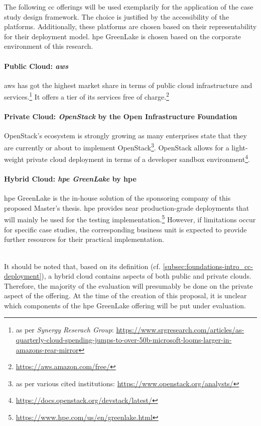 {		The following \ac{cc} offerings will be used exemplarily for the application of the case study design framework. The choice is justified by the accessibility of the platforms. Additionally, these platforms are chosen based on their representability for their deployment model. \acs{hpe} GreenLake is chosen based on the corporate environment of this research. 
		
			\paragraph{Public Cloud: \textit{\acf{aws}}} \ac{aws} has got the highest market share in terms of public cloud infrastructure and services.\footnote{as per \textit{Synergy Reserach Group}: \url{https://www.srgresearch.com/articles/as-quarterly-cloud-spending-jumps-to-over-50b-microsoft-looms-larger-in-amazons-rear-mirror}} It offers a tier of its services free of charge.\footnote{\url{https://aws.amazon.com/free/}}
			\paragraph{Private Cloud: \textit{OpenStack} by the Open Infrastructure Foundation}  OpenStack's ecosystem is strongly growing as many enterprises state that they are currently or about to implement OpenStack\footnote{as per various cited institutions: \url{https://www.openstack.org/analysts/}}. OpenStack allows for a light-weight private cloud deployment in terms of a developer sandbox environment\footnote{\url{https://docs.openstack.org/devstack/latest/}}.
			\paragraph{Hybrid Cloud: \textit{\acs{hpe} GreenLake} by \acl{hpe}} \acs{hpe} GreenLake is the in-house solution of the sponsoring company of this proposed Master's thesis. \ac{hpe} provides near production-grade deployments that will mainly be used for the testing implementation.\footnote{\url{https://www.hpe.com/us/en/greenlake.html}} However, if limitations occur for specific case studies, the corresponding business unit is expected to provide further resources for their practical implementation. \\\
	
		It should be noted that, based on its definition (cf. \autoref{subsec:foundations-intro_cc-deployment}), a hybrid cloud contains aspects of both public and private clouds. Therefore, the majority of the evaluation will presumably be done on the private aspect of the offering. At the time of the creation of this proposal, it is unclear which components of the \ac{hpe} GreenLake offering will be put under evaluation.
	
}
